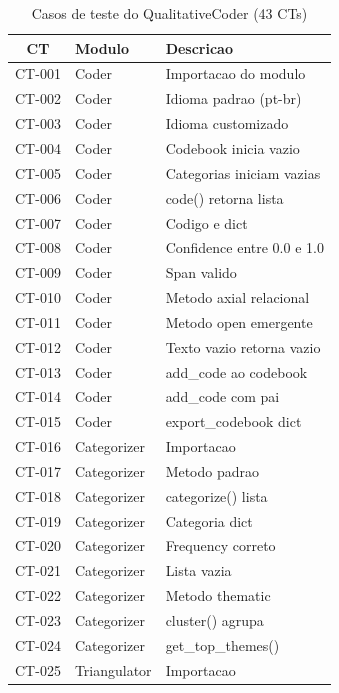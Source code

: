 \begin{table}[htbp]
    \centering
    \caption{Casos de teste do QualitativeCoder (43 CTs)}
    \label{tab:qc_casos_teste}
    \footnotesize
    \begin{tabular}{cll}
        \toprule
        \textbf{CT} & \textbf{Modulo} & \textbf{Descricao} \\
        \midrule
        CT-001 & Coder & Importacao do modulo \\
        CT-002 & Coder & Idioma padrao (pt-br) \\
        CT-003 & Coder & Idioma customizado \\
        CT-004 & Coder & Codebook inicia vazio \\
        CT-005 & Coder & Categorias iniciam vazias \\
        CT-006 & Coder & code() retorna lista \\
        CT-007 & Coder & Codigo e dict \\
        CT-008 & Coder & Confidence entre 0.0 e 1.0 \\
        CT-009 & Coder & Span valido \\
        CT-010 & Coder & Metodo axial relacional \\
        CT-011 & Coder & Metodo open emergente \\
        CT-012 & Coder & Texto vazio retorna vazio \\
        CT-013 & Coder & add\_code ao codebook \\
        CT-014 & Coder & add\_code com pai \\
        CT-015 & Coder & export\_codebook dict \\
        CT-016 & Categorizer & Importacao \\
        CT-017 & Categorizer & Metodo padrao \\
        CT-018 & Categorizer & categorize() lista \\
        CT-019 & Categorizer & Categoria dict \\
        CT-020 & Categorizer & Frequency correto \\
        CT-021 & Categorizer & Lista vazia \\
        CT-022 & Categorizer & Metodo thematic \\
        CT-023 & Categorizer & cluster() agrupa \\
        CT-024 & Categorizer & get\_top\_themes() \\
        CT-025 & Triangulator & Importacao \\

\end{tabular}
\end{table}
